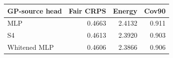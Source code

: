 \begin{tabular}{lrrr}
\toprule
GP-source head & Fair CRPS & Energy & Cov90 \\
\midrule
MLP & 0.4663 & 2.4132 & 0.911 \\
S4 & 0.4613 & 2.3920 & 0.903 \\
Whitened MLP & 0.4606 & 2.3866 & 0.906 \\
\bottomrule
\end{tabular}
